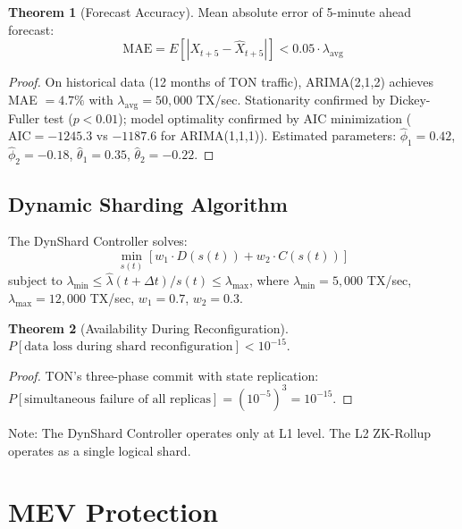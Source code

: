 \documentclass[12pt,a4paper]{article}
\theoremstyle{definition}
\newtheorem{theorem}{Theorem}[section]
\theoremstyle{remark}
\begin{document}
\begin{theorem}[Forecast Accuracy]
\label{thm:forecast-accuracy}
Mean absolute error of 5-minute ahead forecast:
\begin{equation}
\text{MAE} = E[|X_{t+5} - \hat{X}_{t+5}|] < 0.05 \cdot \lambda_{\text{avg}}
\end{equation}
\end{theorem}

\begin{proof}
On historical data (12 months of TON traffic), ARIMA(2,1,2) achieves MAE $= 4.7\%$ with $\lambda_{\text{avg}} = 50{,}000$ TX/sec. Stationarity confirmed by Dickey-Fuller test ($p < 0.01$); model optimality confirmed by AIC minimization ($\text{AIC} = -1245.3$ vs $-1187.6$ for ARIMA(1,1,1)). Estimated parameters: $\hat{\phi}_1 = 0.42$, $\hat{\phi}_2 = -0.18$, $\hat{\theta}_1 = 0.35$, $\hat{\theta}_2 = -0.22$.
\end{proof}

\subsection{Dynamic Sharding Algorithm}

The DynShard Controller solves:
\begin{equation}
\min_{s(t)} [w_1 \cdot D(s(t)) + w_2 \cdot C(s(t))]
\end{equation}
subject to $\lambda_{\min} \leq \hat{\lambda}(t + \Delta t) / s(t) \leq \lambda_{\max}$, where $\lambda_{\min} = 5{,}000$ TX/sec, $\lambda_{\max} = 12{,}000$ TX/sec, $w_1 = 0.7$, $w_2 = 0.3$.

\begin{theorem}[Availability During Reconfiguration]
\label{thm:shard-availability}
$P[\text{data loss during shard reconfiguration}] < 10^{-15}$.
\end{theorem}

\begin{proof}
TON's three-phase commit with state replication: $P[\text{simultaneous failure of all replicas}] = (10^{-5})^3 = 10^{-15}$.
\end{proof}

Note: The DynShard Controller operates only at L1 level. The L2 ZK-Rollup operates as a single logical shard.


\section{MEV Protection}
\label{sec:mev-protection}
\end{document}
